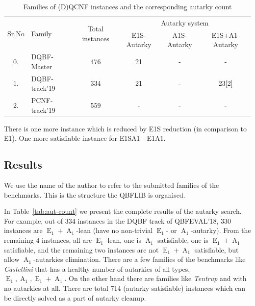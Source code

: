 \documentclass[runningheads]{llncs}
\DeclareMathOperator{\Aaut}{A}
\DeclareMathOperator{\Eaut}{E}
\begin{document}
\begin{table}
  \caption{Families of (D)QCNF instances and the corresponding autarky count}\label{tab:aut-count1}
  \begin{tabular}{c|l|c|c|c|c}
    
    \hline
    \multirow{2}{1cm}{Sr.No} &  \multirow{2}{3cm}{Family} &  \multirow{2}{2cm}{Total instances} & \multicolumn{3}{c}{Autarky system} \\
    \cline{4-6}
    & & & E1S-Autarky & A1S-Autarky & E1S+A1-Autarky \\
    
    \hline
    0. & DQBF-Master &  476 & 21 & - & - \\ \hline
    1. & DQBF-track'19 &  334 & 21 & - & 23[2] \\ \hline
    2. & PCNF-track'19 &  559 & - & - & - \\ \hline
    
\hline
\end{tabular}
\end{table}
There is one more instance which is reduced by E1S reduction (in comparison to E1). One more satisfiable instance for E1SA1 - E1A1.

\subsection{Results}
We use the name of the author to refer to the submitted families of the benchmarks. This is the structure the QBFLIB is organised.

In Table~\ref{tab:aut-count} we present the complete results of the autarky search. For example, out of 334 instances in the DQBF track of QBFEVAL'18, 330 instances are $\Eaut_1+\Aaut_1$-lean (have no non-trivial $\Eaut_1$- or $\Aaut_1$-autarky). From the remaining 4 instances, all are $\Eaut_1$-lean, one is $\Aaut_1$ satisfiable, one is $\Eaut_1+\Aaut_1$ satisfiable, and the remaining two instances are not $\Eaut_1+\Aaut_1$ satisfiable, but allow $\Aaut_1$-autarkies elimination.
%
There are a few families of the benchmarks like \textit{Castellini} that has a healthy number of autarkies of all types, $\Eaut_1,\Aaut_1,\Eaut_1+\Aaut_1$. On the other hand there are families like \textit{Tentrup} and  with no autarkies at all. There are total 714 (autarky satisfiable) instances which can be directly solved as a part of autarky cleanup.
\end{document}
